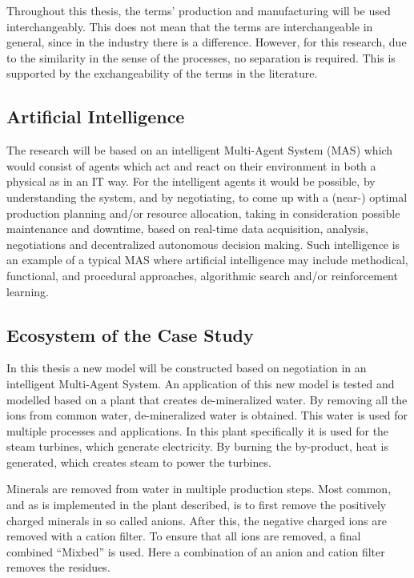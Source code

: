 Throughout this thesis, the terms' production and manufacturing will be used interchangeably. This does not mean that the terms are interchangeable in general, since in the industry there is a difference. However, for this research, due to the similarity in the sense of the processes, no separation is required. This is supported by the exchangeability of the terms in the literature. 

\subsection{Artificial Intelligence}
The research will be based on an intelligent Multi-Agent System (MAS) which would consist of agents which act and react on their environment in both a physical as in an IT way. For the intelligent agents it would be possible, by understanding the system, and by negotiating, to come up with a (near-) optimal production planning and/or resource allocation, taking in consideration possible maintenance and downtime, based on real-time data acquisition, analysis, negotiations and decentralized autonomous decision making. Such intelligence is an example of a typical MAS where artificial intelligence may include methodical, functional, and procedural approaches, algorithmic search and/or reinforcement learning. 

\subsection{Ecosystem of the Case Study}
\label{sec:intro_ecosystem}
In this thesis a new model will be constructed based on negotiation in an intelligent Multi-Agent System. An application of this new model is tested and modelled based on a plant that creates de-mineralized water. By removing all the ions from common water, de-mineralized water is obtained. This water is used for multiple processes and applications. In this plant specifically it is used for the steam turbines, which generate electricity. By burning the by-product, heat is generated, which creates steam to power the turbines. 

Minerals are removed from water in multiple production steps. Most common, and as is implemented in the plant described, is to first remove the positively charged minerals in so called anions. After this, the negative charged ions are removed with a cation filter. To ensure that all ions are removed, a final combined ``Mixbed'' is used. Here a combination of an anion and cation filter removes the residues.

